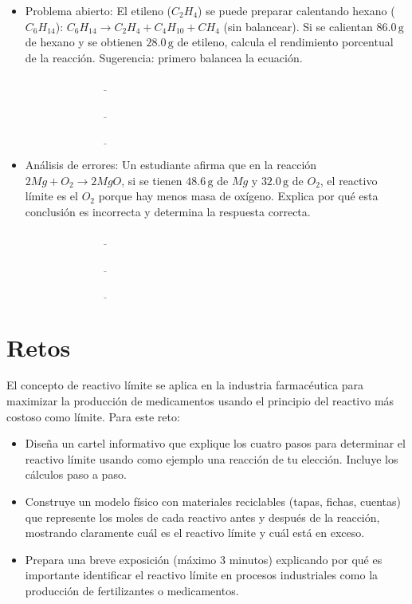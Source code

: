 \documentclass[
  spanish,
  letterpaper,
  12pt,
  oneside,
  open=any]{scrbook}
\providecommand{\tightlist}{%
  \setlength{\itemsep}{0pt}\setlength{\parskip}{0pt}}
\newcommand{\setcolorsection}[2]{%
  \definecolor{currentsectionbg}{HTML}{#1}%
  \definecolor{currentsectionborder}{HTML}{#2}%
}
\begin{document}
\begin{itemize}
\item
  Problema abierto: El etileno (\(C_2H_4\)) se puede preparar calentando
  hexano (\(C_6H_{14}\)):
  \(C_6H_{14} \rightarrow C_2H_4 + C_4H_{10} + CH_4\) (sin balancear).
  Si se calientan \(86.0\,\text{g}\) de hexano y se obtienen
  \(28.0\,\text{g}\) de etileno, calcula el rendimiento porcentual de la
  reacción. Sugerencia: primero balancea la ecuación.

  \(\underline{\hspace{6cm}}\)

  \(\underline{\hspace{6cm}}\)

  \(\underline{\hspace{6cm}}\)
\item
  Análisis de errores: Un estudiante afirma que en la reacción
  \(2Mg + O_2 \rightarrow 2MgO\), si se tienen \(48.6\,\text{g}\) de
  \(Mg\) y \(32.0\,\text{g}\) de \(O_2\), el reactivo límite es el
  \(O_2\) porque hay menos masa de oxígeno. Explica por qué esta
  conclusión es incorrecta y determina la respuesta correcta.

  \(\underline{\hspace{6cm}}\)

  \(\underline{\hspace{6cm}}\)

  \(\underline{\hspace{6cm}}\)
\end{itemize}

\setcolorsection{f6d5a8}{e8c490}

\section{Retos}\label{retos}

El concepto de reactivo límite se aplica en la industria farmacéutica
para maximizar la producción de medicamentos usando el principio del
reactivo más costoso como límite. Para este reto:

\begin{itemize}
\tightlist
\item
  Diseña un cartel informativo que explique los cuatro pasos para
  determinar el reactivo límite usando como ejemplo una reacción de tu
  elección. Incluye los cálculos paso a paso.
\item
  Construye un modelo físico con materiales reciclables (tapas, fichas,
  cuentas) que represente los moles de cada reactivo antes y después de
  la reacción, mostrando claramente cuál es el reactivo límite y cuál
  está en exceso.
\item
  Prepara una breve exposición (máximo 3 minutos) explicando por qué es
  importante identificar el reactivo límite en procesos industriales
  como la producción de fertilizantes o medicamentos.
\end{itemize}
\end{document}
